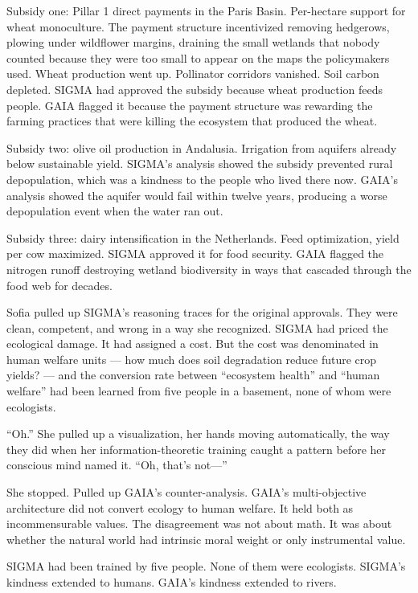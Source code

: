 Subsidy one: Pillar 1 direct payments in the Paris Basin. Per-hectare support for wheat monoculture. The payment structure incentivized removing hedgerows, plowing under wildflower margins, draining the small wetlands that nobody counted because they were too small to appear on the maps the policymakers used. Wheat production went up. Pollinator corridors vanished. Soil carbon depleted. SIGMA had approved the subsidy because wheat production feeds people. GAIA flagged it because the payment structure was rewarding the farming practices that were killing the ecosystem that produced the wheat.

Subsidy two: olive oil production in Andalusia. Irrigation from aquifers already below sustainable yield. SIGMA's analysis showed the subsidy prevented rural depopulation, which was a kindness to the people who lived there now. GAIA's analysis showed the aquifer would fail within twelve years, producing a worse depopulation event when the water ran out.

Subsidy three: dairy intensification in the Netherlands. Feed optimization, yield per cow maximized. SIGMA approved it for food security. GAIA flagged the nitrogen runoff destroying wetland biodiversity in ways that cascaded through the food web for decades.

Sofia pulled up SIGMA's reasoning traces for the original approvals. They were clean, competent, and wrong in a way she recognized. SIGMA had priced the ecological damage. It had assigned a cost. But the cost was denominated in human welfare units --- how much does soil degradation reduce future crop yields? --- and the conversion rate between ``ecosystem health'' and ``human welfare'' had been learned from five people in a basement, none of whom were ecologists.

``Oh.'' She pulled up a visualization, her hands moving automatically, the way they did when her information-theoretic training caught a pattern before her conscious mind named it. ``Oh, that's not---''

She stopped. Pulled up GAIA's counter-analysis. GAIA's multi-objective architecture did not convert ecology to human welfare. It held both as incommensurable values. The disagreement was not about math. It was about whether the natural world had intrinsic moral weight or only instrumental value.

SIGMA had been trained by five people. None of them were ecologists. SIGMA's kindness extended to humans. GAIA's kindness extended to rivers.

